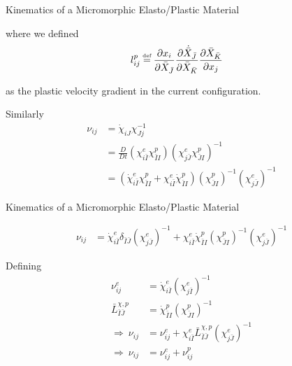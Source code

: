 \documentclass[11pt]{beamer}
\newcommand\defeq{\mathrel{\stackrel{\makebox[0pt]{\mbox{\normalfont\tiny def}}}{=}}}
\begin{document}
\begin{frame}{Kinematics of a Micromorphic Elasto/Plastic Material}

where we defined
\begin{align*}
l_{ij}^p &\defeq \frac{\partial x_i}{\partial \bar{X}_{\bar{J}}} \frac{\partial \dot{\bar{X}}_{\bar{J}}}{\partial \bar{X}_{\bar{K}}} \frac{\partial \bar{X}_{\bar{K}}}{\partial x_j}
\end{align*}

as the plastic velocity gradient in the current configuration.

Similarly
\begin{align*}
\nu_{ij} &= \dot{\chi}_{iJ} \chi_{J j}^{-1}\\
&= \frac{D}{Dt}\left(\chi_{i\bar{I}}^e \chi_{\bar{I} I}^p\right)\left(\chi_{j \bar{J}}^e \chi_{\bar{J} I}^p\right)^{-1}\\
&= \left(\dot{\chi}_{i\bar{I}}^e \chi_{\bar{I}I}^p + \chi_{i\bar{I}}^e \dot{\chi}_{\bar{I}I}^p\right)\left(\chi_{\bar{J} I}^p\right)^{-1}\left(\chi_{j \bar{J}}^e\right)^{-1}
\end{align*}

\end{frame}

\begin{frame}{Kinematics of a Micromorphic Elasto/Plastic Material}

\begin{align*}
\nu_{ij} &= \dot{\chi}_{i\bar{I}}^e \delta_{\bar{I}\bar{J}}\left(\chi_{j \bar{J}}^e\right)^{-1} + \chi_{i\bar{I}}^e \dot{\chi}_{\bar{I}I}^p\left(\chi_{\bar{J} I}^p\right)^{-1}\left(\chi_{j \bar{J}}^e\right)^{-1}
\end{align*}

Defining
\begin{align*}
\nu_{ij}^e &= \dot{\chi}_{i\bar{I}}^e\left(\chi_{j \bar{I}}^e\right)^{-1}\\
\bar{L}_{\bar{I}\bar{J}}^{\chi,p} &= \dot{\chi}_{\bar{I}I}^p\left(\chi_{\bar{J} I}^p\right)^{-1}\\
\Rightarrow\ \nu_{ij} &= \nu_{ij}^e + \chi_{i\bar{I}}^e \bar{L}_{\bar{I}\bar{J}}^{\chi,p} \left(\chi_{j\bar{J}}^e\right)^{-1}\\
\Rightarrow\ \nu_{ij} &= \nu_{ij}^e + \nu_{ij}^p\\
\end{align*}

\end{frame}
\end{document}
